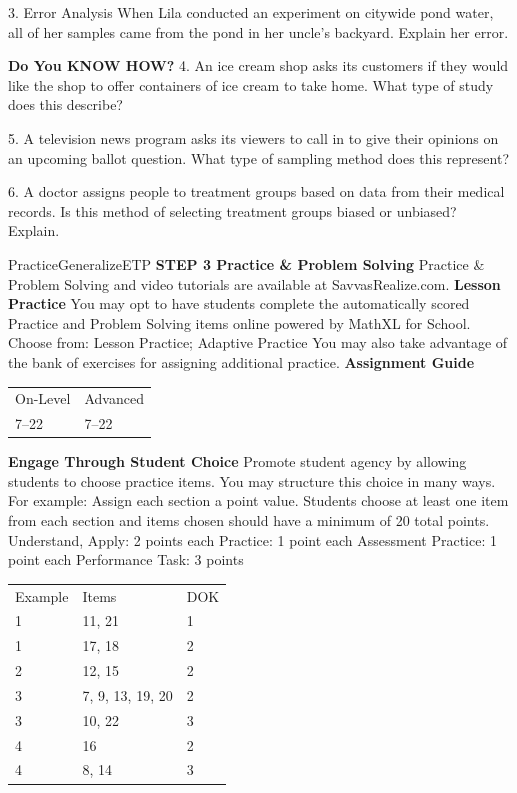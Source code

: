 \documentclass{article}
\newenvironment{item-analysis}{}{}      %
\newenvironment{concept-summary}{}{}    %
\newenvironment{te-addendum}[2]{}{}     %
\newcommand{\answer}[1]{}               %
\newcommand{\te}[1]{}                   %
\begin{document}
\begin{concept-summary}
\answer{bias}
3. Error Analysis When Lila conducted an experiment on citywide pond water, all of her samples came from the pond in her uncle's backyard. Explain her error.
\answer{Water sampled from only one pond cannot possibly reflect all pond water in the city. This was an example of convenience sampling.}
\textbf{Do You KNOW HOW?}
4. An ice cream shop asks its customers if they would like the shop to offer containers of ice cream to take home. What type of study does this describe?
\answer{sample survey}
5. A television news program asks its viewers to call in to give their opinions on an upcoming ballot question. What type of sampling method does this represent?
\answer{a self-selected sample}
6. A doctor assigns people to treatment groups based on data from their medical records. Is this method of selecting treatment groups biased or unbiased? Explain.
\answer{The method is biased because the doctor is using patients' medical records to assign them to a group rather than assigning them randomly.}
\end{concept-summary}
\begin{te-addendum}{Practice}{GeneralizeETP}
\textbf{STEP 3 Practice & Problem Solving}
Practice \& Problem Solving and video tutorials are available at SavvasRealize.com.
\textbf{Lesson Practice} You may opt to have students complete the automatically scored Practice and Problem Solving items online powered by MathXL for School.
Choose from: Lesson Practice; Adaptive Practice
You may also take advantage of the bank of exercises for assigning additional practice.
\textbf{Assignment Guide}
\begin{tabular}{ll}
On-Level & Advanced \\
7–22 & 7–22 \\
\end{tabular}
\textbf{Engage Through Student Choice}
Promote student agency by allowing students to choose practice items. You may structure this choice in many ways. For example:
Assign each section a point value. Students choose at least one item from each section and items chosen should have a minimum of 20 total points.
Understand, Apply: 2 points each
Practice: 1 point each
Assessment Practice: 1 point each
Performance Task: 3 points
\te{Scan the QR code to access a video tutorial.}
\end{te-addendum}
\begin{item-analysis}
\begin{tabular}{lll}
Example & Items & DOK \\
1 & 11, 21 & 1 \\
1 & 17, 18 & 2 \\
2 & 12, 15 & 2 \\
3 & 7, 9, 13, 19, 20 & 2 \\
3 & 10, 22 & 3 \\
4 & 16 & 2 \\
4 & 8, 14 & 3 \\
\end{tabular}
\end{item-analysis}
\end{document}

